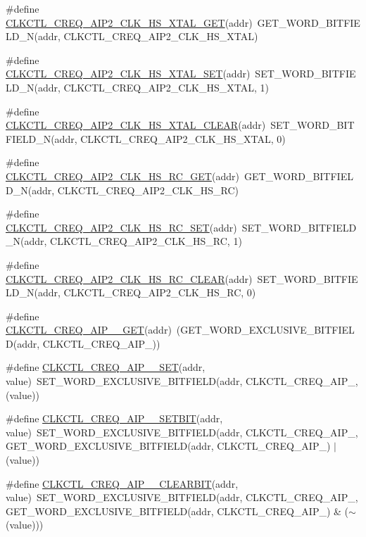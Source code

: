 \begin{DoxyCompactItemize}
\item 
\#define \hyperlink{a00544_aede633762751a1d76d239c70f618af1c}{CLKCTL\_\-CREQ\_\-AIP2\_\-CLK\_\-HS\_\-XTAL\_\-GET}(addr)~GET\_\-WORD\_\-BITFIELD\_\-N(addr, CLKCTL\_\-CREQ\_\-AIP2\_\-CLK\_\-HS\_\-XTAL)
\item 
\#define \hyperlink{a00544_a4580e3a9f125a2f26cc60eb2d6b5be7c}{CLKCTL\_\-CREQ\_\-AIP2\_\-CLK\_\-HS\_\-XTAL\_\-SET}(addr)~SET\_\-WORD\_\-BITFIELD\_\-N(addr, CLKCTL\_\-CREQ\_\-AIP2\_\-CLK\_\-HS\_\-XTAL, 1)
\item 
\#define \hyperlink{a00544_a8a93d63d33dd810a20a0e47eea045359}{CLKCTL\_\-CREQ\_\-AIP2\_\-CLK\_\-HS\_\-XTAL\_\-CLEAR}(addr)~SET\_\-WORD\_\-BITFIELD\_\-N(addr, CLKCTL\_\-CREQ\_\-AIP2\_\-CLK\_\-HS\_\-XTAL, 0)
\item 
\#define \hyperlink{a00544_a6caa720689815a53da692e3c4ec0f97e}{CLKCTL\_\-CREQ\_\-AIP2\_\-CLK\_\-HS\_\-RC\_\-GET}(addr)~GET\_\-WORD\_\-BITFIELD\_\-N(addr, CLKCTL\_\-CREQ\_\-AIP2\_\-CLK\_\-HS\_\-RC)
\item 
\#define \hyperlink{a00544_aa213df0a032ae932df58c03063d16cd0}{CLKCTL\_\-CREQ\_\-AIP2\_\-CLK\_\-HS\_\-RC\_\-SET}(addr)~SET\_\-WORD\_\-BITFIELD\_\-N(addr, CLKCTL\_\-CREQ\_\-AIP2\_\-CLK\_\-HS\_\-RC, 1)
\item 
\#define \hyperlink{a00544_a444adb2cef685a35d57bd3cc6e0205e4}{CLKCTL\_\-CREQ\_\-AIP2\_\-CLK\_\-HS\_\-RC\_\-CLEAR}(addr)~SET\_\-WORD\_\-BITFIELD\_\-N(addr, CLKCTL\_\-CREQ\_\-AIP2\_\-CLK\_\-HS\_\-RC, 0)
\item 
\#define \hyperlink{a00544_a5f21c7cc9860a894d44f0d98e3ec85ac}{CLKCTL\_\-CREQ\_\-AIP\_\_\-GET}(addr)~(GET\_\-WORD\_\-EXCLUSIVE\_\-BITFIELD(addr, CLKCTL\_\-CREQ\_\-AIP\_))
\item 
\#define \hyperlink{a00544_a30962e06b9ba3db88bf48f338e9111e5}{CLKCTL\_\-CREQ\_\-AIP\_\_\-SET}(addr, value)~SET\_\-WORD\_\-EXCLUSIVE\_\-BITFIELD(addr, CLKCTL\_\-CREQ\_\-AIP\_, (value))
\item 
\#define \hyperlink{a00544_a58fb17193c62644456702db92340f6d5}{CLKCTL\_\-CREQ\_\-AIP\_\_\-SETBIT}(addr, value)~SET\_\-WORD\_\-EXCLUSIVE\_\-BITFIELD(addr, CLKCTL\_\-CREQ\_\-AIP\_, GET\_\-WORD\_\-EXCLUSIVE\_\-BITFIELD(addr, CLKCTL\_\-CREQ\_\-AIP\_) $|$ (value))
\item 
\#define \hyperlink{a00544_acb5c6819a25829b661ded2afa7ba50ab}{CLKCTL\_\-CREQ\_\-AIP\_\_\-CLEARBIT}(addr, value)~SET\_\-WORD\_\-EXCLUSIVE\_\-BITFIELD(addr, CLKCTL\_\-CREQ\_\-AIP\_, GET\_\-WORD\_\-EXCLUSIVE\_\-BITFIELD(addr, CLKCTL\_\-CREQ\_\-AIP\_) \& ($\sim$(value)))
\item 

\end{DoxyCompactItemize}
